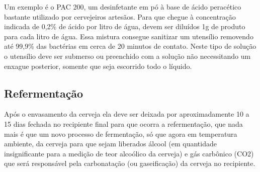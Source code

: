 Um exemplo é o PAC 200, um desinfetante em pó à base de ácido peracético bastante utilizado por cervejeiros artesãos. Para que chegue à concentração indicada de 0,2\% de ácido por litro de água, devem ser diluídos 1g de produto para cada litro de água. Essa mistura consegue sanitizar um utensílio removendo até 99,9\% das bactérias em cerca de 20 minutos de contato. Neste tipo de solução o utensílio deve ser submerso ou preenchido com a solução não necessitando um enxague posterior, somente que seja escorrido todo o líquido.

\subsection{Refermentação}
Após o envasamento da cerveja ela deve ser deixada por aproximadamente 10 a 15 dias fechada no recipiente final para que ocorra a refermentação, que nada mais é que um novo processo de fermentação, só que agora em temperatura ambiente, da cerveja para que sejam liberados álcool (em quantidade insignificante para a medição de teor alcoólico da cerveja) e gás carbônico (CO2) que será responsável pela carbonatação (ou gaseificação) da cerveja no recipiente.
